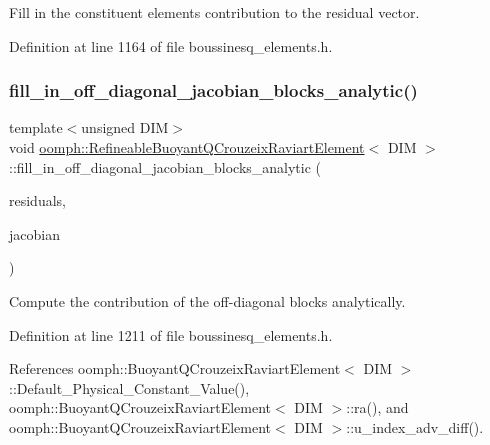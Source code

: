 Fill in the constituent elements\textquotesingle{} contribution to the residual vector. 



Definition at line 1164 of file boussinesq\+\_\+elements.\+h.

\mbox{\label{classoomph_1_1RefineableBuoyantQCrouzeixRaviartElement_a6fe93946149c696f273be12540099d1a}} 
\subsubsection{\texorpdfstring{fill\+\_\+in\+\_\+off\+\_\+diagonal\+\_\+jacobian\+\_\+blocks\+\_\+analytic()}{fill\_in\_off\_diagonal\_jacobian\_blocks\_analytic()}}
{\footnotesize\ttfamily template$<$unsigned D\+IM$>$ \\
void \hyperlink{classoomph_1_1RefineableBuoyantQCrouzeixRaviartElement}{oomph\+::\+Refineable\+Buoyant\+Q\+Crouzeix\+Raviart\+Element}$<$ D\+IM $>$\+::fill\+\_\+in\+\_\+off\+\_\+diagonal\+\_\+jacobian\+\_\+blocks\+\_\+analytic (\begin{DoxyParamCaption}\item[{Vector$<$ double $>$ \&}]{residuals,  }\item[{Dense\+Matrix$<$ double $>$ \&}]{jacobian }\end{DoxyParamCaption})\hspace{0.3cm}{\ttfamily [inline]}}



Compute the contribution of the off-\/diagonal blocks analytically. 



Definition at line 1211 of file boussinesq\+\_\+elements.\+h.



References oomph\+::\+Buoyant\+Q\+Crouzeix\+Raviart\+Element$<$ D\+I\+M $>$\+::\+Default\+\_\+\+Physical\+\_\+\+Constant\+\_\+\+Value(), oomph\+::\+Buoyant\+Q\+Crouzeix\+Raviart\+Element$<$ D\+I\+M $>$\+::ra(), and oomph\+::\+Buoyant\+Q\+Crouzeix\+Raviart\+Element$<$ D\+I\+M $>$\+::u\+\_\+index\+\_\+adv\+\_\+diff().

